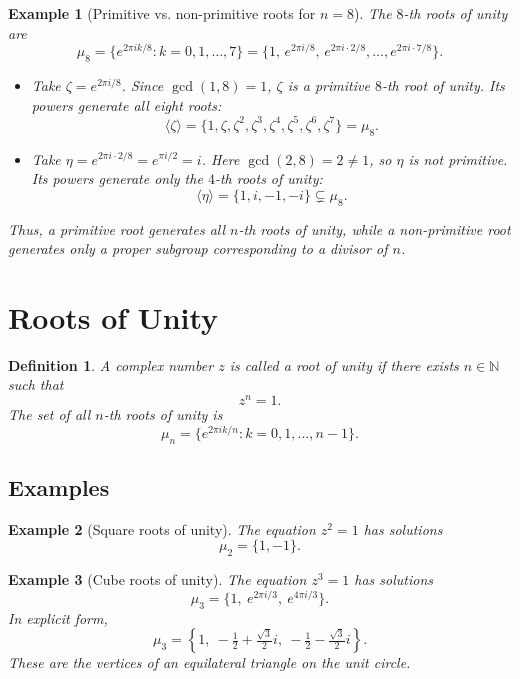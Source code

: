 \documentclass[12pt]{article}
\newtheorem{definition}{Definition}
\newtheorem{example}{Example}
\begin{document}
	\begin{example}[Primitive vs. non-primitive roots for $n=8$]
		
		The $8$-th roots of unity are
		$$
		\mu_8 = \{ e^{2\pi i k / 8} : k=0,1,\dots,7 \}
		= \{ 1, \, e^{2\pi i/8}, \, e^{2\pi i\cdot 2/8}, \dots, e^{2\pi i\cdot 7/8} \}.
		$$
		
		\begin{itemize}
			\item Take $\zeta = e^{2\pi i/8}$. Since $\gcd(1,8)=1$, $\zeta$ is a primitive $8$-th root of unity.
			Its powers generate all eight roots:
			$$
			\langle \zeta \rangle = \{ 1, \zeta, \zeta^2, \zeta^3, \zeta^4, \zeta^5, \zeta^6, \zeta^7 \} = \mu_8.
			$$
			
			\item Take $\eta = e^{2\pi i \cdot 2/8} = e^{\pi i/2} = i$. 
			Here $\gcd(2,8)=2 \neq 1$, so $\eta$ is not primitive. 
			Its powers generate only the $4$-th roots of unity:
			$$
			\langle \eta \rangle = \{ 1, i, -1, -i \} \subsetneq \mu_8.
			$$
		\end{itemize}
		
		Thus, a primitive root generates all $n$-th roots of unity, while a non-primitive root generates only a proper subgroup corresponding to a divisor of $n$.
	\end{example}
	\section*{Roots of Unity}
	
	\begin{definition}
		A complex number $z$ is called a \emph{root of unity} if there exists $n \in \mathbb{N}$ such that
		$$
		z^n = 1.
		$$
		The set of all $n$-th roots of unity is
		$$
		\mu_n = \{ e^{2\pi i k / n} : k = 0,1,\dots,n-1 \}.
		$$
	\end{definition}
	
	\subsection*{Examples}
	
	\begin{example}[Square roots of unity]
		The equation $z^2=1$ has solutions
		$$
		\mu_2 = \{1, -1\}.
		$$
	\end{example}
	
	\begin{example}[Cube roots of unity]
		The equation $z^3=1$ has solutions
		$$
		\mu_3 = \{ 1, \ e^{2\pi i/3}, \ e^{4\pi i/3} \}.
		$$
		In explicit form,
		$$
		\mu_3 = \left\{ 1, \ -\tfrac{1}{2}+\tfrac{\sqrt{3}}{2}i, \ -\tfrac{1}{2}-\tfrac{\sqrt{3}}{2}i \right\}.
		$$
		These are the vertices of an equilateral triangle on the unit circle.
	\end{example}
	
\end{document}
